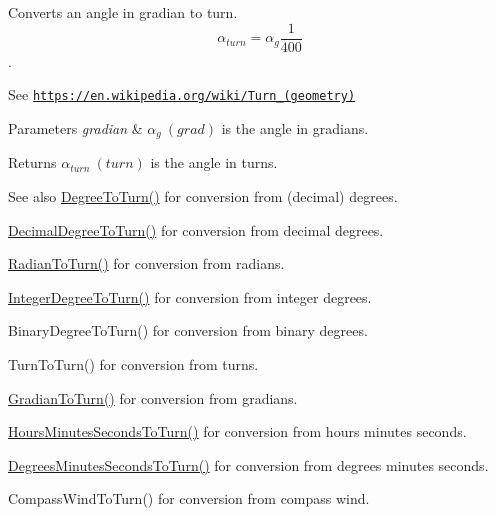 Converts an angle in gradian to turn. \[\alpha_{turn}=\alpha_{g}\frac{1}{400}\]. 

See \href{https://en.wikipedia.org/wiki/Turn_(geometry)}{\tt https\+://en.\+wikipedia.\+org/wiki/\+Turn\+\_\+(geometry)} 
\begin{DoxyParams}{Parameters}
{\em gradian} & $\alpha_{g}\ (grad)$ is the angle in gradians. \\
\hline
\end{DoxyParams}
\begin{DoxyReturn}{Returns}
$\alpha_{turn}\ (turn)$ is the angle in turns. 
\end{DoxyReturn}
\begin{DoxySeeAlso}{See also}
\mbox{\hyperlink{group___e_g_x_math-_conversions-_angle_conversions-_degree_gafb4ce930493a7d6202ede3ee1630ef5d}{Degree\+To\+Turn()}} for conversion from (decimal) degrees. 

\mbox{\hyperlink{group___e_g_x_math-_conversions-_angle_conversions-_decimal_degree_ga396a13c10acdef5026c12f3217b142c1}{Decimal\+Degree\+To\+Turn()}} for conversion from decimal degrees. 

\mbox{\hyperlink{group___e_g_x_math-_conversions-_angle_conversions-_radian_ga8492d6d2f6467c619b65e5fb75a9ae04}{Radian\+To\+Turn()}} for conversion from radians. 

\mbox{\hyperlink{group___e_g_x_math-_conversions-_angle_conversions-_integer_degree_ga06ddbdada5a3978105c855d4aae735ae}{Integer\+Degree\+To\+Turn()}} for conversion from integer degrees. 

Binary\+Degree\+To\+Turn() for conversion from binary degrees. 

Turn\+To\+Turn() for conversion from turns. 

\mbox{\hyperlink{group___e_g_x_math-_conversions-_angle_conversions-_gradian_ga11b42138910d26474f47c0a2043911c9}{Gradian\+To\+Turn()}} for conversion from gradians. 

\mbox{\hyperlink{group___e_g_x_math-_conversions-_angle_conversions-_hours_minutes_seconds_ga68050282994968cd6f80a396f6a539ae}{Hours\+Minutes\+Seconds\+To\+Turn()}} for conversion from hours minutes seconds. 

\mbox{\hyperlink{group___e_g_x_math-_conversions-_angle_conversions-_degrees_minutes_seconds_ga1e6b1b889f6914942b12623934341fc6}{Degrees\+Minutes\+Seconds\+To\+Turn()}} for conversion from degrees minutes seconds. 

Compass\+Wind\+To\+Turn() for conversion from compass wind. 
\end{DoxySeeAlso}
